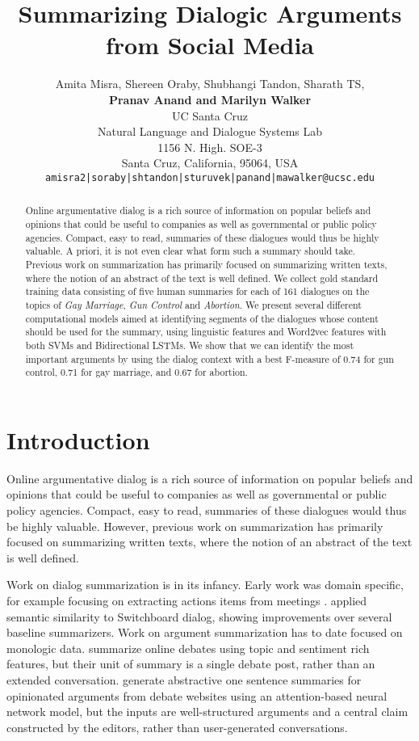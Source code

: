 \documentclass[11pt]{article}
\title{Summarizing Dialogic Arguments from Social Media}
\author{Amita Misra, Shereen Oraby, Shubhangi Tandon, Sharath TS, \\
            {\bf Pranav Anand  and  Marilyn Walker}\\
	    UC Santa Cruz\\
	Natural Language and Dialogue Systems Lab \\
    1156 N. High. SOE-3\\
	    Santa Cruz, California, 95064, USA\\
	    {\tt amisra2|soraby|shtandon|sturuvek|panand|mawalker@ucsc.edu} \date{}
}
\begin{document}
\maketitle

\begin{abstract}
Online argumentative dialog is a rich source of information on
popular beliefs and opinions that could be useful to companies as well
as governmental or public policy agencies.  Compact, easy to read,
summaries of these dialogues would thus be highly valuable.  A
priori, it is not even clear what form such a summary should take.
Previous work on summarization has primarily focused on summarizing
written texts, where the notion of an abstract of the text is well
defined. We collect gold standard training data consisting of five human
summaries for each of 161 dialogues on the topics of {\it Gay Marriage},
{\it Gun Control} and {\it Abortion}.  We present several different
computational models aimed at identifying segments of the dialogues
whose content should be used for the summary, using linguistic features and Word2vec features 
with both SVMs and
Bidirectional LSTMs. We show that we can identify the most important
arguments by using the dialog context with a best F-measure of 0.74 for
gun control, 0.71 for gay marriage, and 0.67 for abortion.

\end{abstract}

\section{Introduction}
\label{intro-sec}

Online argumentative dialog is a rich source of information on
popular beliefs and opinions that could be useful to companies as well
as governmental or public policy agencies.  Compact, easy to read,
summaries of these dialogues would thus be highly valuable. 
However, previous work on summarization has primarily focused on summarizing
written texts, where the notion of an abstract of the text is well
defined. 

Work on dialog summarization is in its infancy.  Early work was domain
specific, for example focusing on extracting actions items from
meetings \cite{Murray08summarizingspoken}. 
applied semantic similarity to Switchboard dialog, showing
improvements over several baseline summarizers. Work on argument
summarization has to date focused on monologic
data.  summarize online debates using topic and
sentiment rich features, but their unit of summary is a single debate
post, rather than an extended conversation. 
generate abstractive one sentence summaries for opinionated arguments
from debate websites using an attention-based neural network model,
but the inputs are well-structured arguments and a central claim
constructed by the editors, rather than user-generated conversations.
\end{document}
